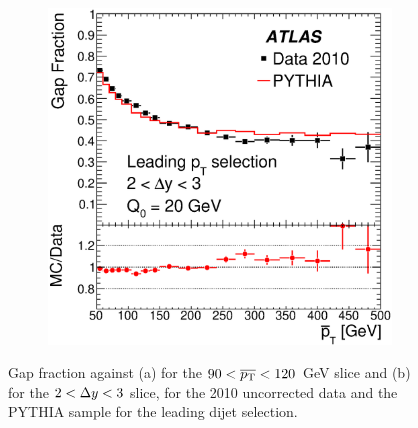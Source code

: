\begin{figure}
\begin{subfigure}[b]{0.5\textwidth}
                \includegraphics[width=\textwidth]{figures/GBJ1/UncorrectedData/RatioGF_selA_DeltaY_2_3.eps}
        \end{subfigure}%
\caption[Comparison of gap fraction versus \dy{} and \ptb{} between the data and the reconstructed PYTHIA sample for leading \pt{} dijet selection]{
Gap fraction against (a) \dy{} for the $90<\mbox{$\overline{p_{\rm T}}$}{}<120$~GeV slice and (b) \ptb{} for the $2 < \mbox{$\Delta y$}{} <3$ slice, for the 2010 uncorrected data and the PYTHIA sample for the leading \pt{} dijet selection.
\label{Uncorr_GF}}
\end{figure}


